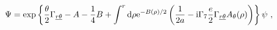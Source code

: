 \begin{equation}
\Psi = 
\exp\left\{\frac{\theta}{2}    
\Gamma_{\underline{r}\underline{\theta}} -A-{1\over 4}B +
\int^r{\rm d}\rho{\rm e}^{-B(\rho)/2}
\left({1\over 2a}-{\rm i}\Gamma_7{e\over 2}
\Gamma_{\underline{r}\underline{\theta}}
A_\theta(\rho)\right)\right\}\psi~,
\label{change}
\end{equation}

